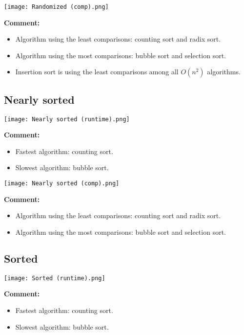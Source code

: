 \documentclass[12pt]{article}
\begin{document}
\begin{center}
    \newpage
    \texttt{[image: Randomized (comp).png]}
\end{center}
\textbf{Comment:}
\begin{itemize}
    \item Algorithm using the least comparisons: counting sort and radix sort.
    \item Algorithm using the most comparisons: bubble sort and selection sort.
    \item Insertion sort is using the least comparisons among all $O(n^2)$ algorithms.
\end{itemize}

\newpage
\subsection{Nearly sorted}
\begin{center}
    \texttt{[image: Nearly sorted (runtime).png]}
\end{center}
\textbf{Comment:}
\begin{itemize}
    \item Fastest algorithm: counting sort.
    \item Slowest algorithm: bubble sort.
\end{itemize}

\begin{center}
    \newpage
    \texttt{[image: Nearly sorted (comp).png]}
\end{center}
\textbf{Comment:}
\begin{itemize}
    \item Algorithm using the least comparisons: counting sort and radix sort.
    \item Algorithm using the most comparisons: bubble sort and selection sort.
\end{itemize}

\newpage
\subsection{Sorted}
\begin{center}
    \texttt{[image: Sorted (runtime).png]}
\end{center}
\textbf{Comment:}
\begin{itemize}
    \item Fastest algorithm: counting sort.
    \item Slowest algorithm: bubble sort.
\end{itemize}
\end{document}
